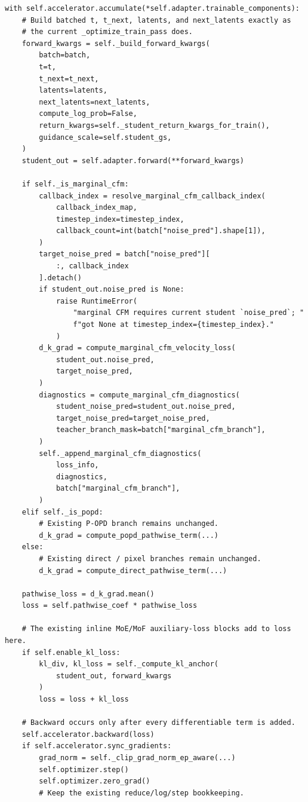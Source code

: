 \documentclass[11pt,a4paper]{article}
\theoremstyle{plain}
\theoremstyle{definition}
\begin{document}
\begin{lstlisting}[style=python,caption={Implemented A4 branch inside the existing optimizer shell, abbreviated.}]
with self.accelerator.accumulate(*self.adapter.trainable_components):
    # Build batched t, t_next, latents, and next_latents exactly as
    # the current _optimize_train_pass does.
    forward_kwargs = self._build_forward_kwargs(
        batch=batch,
        t=t,
        t_next=t_next,
        latents=latents,
        next_latents=next_latents,
        compute_log_prob=False,
        return_kwargs=self._student_return_kwargs_for_train(),
        guidance_scale=self.student_gs,
    )
    student_out = self.adapter.forward(**forward_kwargs)

    if self._is_marginal_cfm:
        callback_index = resolve_marginal_cfm_callback_index(
            callback_index_map,
            timestep_index=timestep_index,
            callback_count=int(batch["noise_pred"].shape[1]),
        )
        target_noise_pred = batch["noise_pred"][
            :, callback_index
        ].detach()
        if student_out.noise_pred is None:
            raise RuntimeError(
                "marginal CFM requires current student `noise_pred`; "
                f"got None at timestep_index={timestep_index}."
            )
        d_k_grad = compute_marginal_cfm_velocity_loss(
            student_out.noise_pred,
            target_noise_pred,
        )
        diagnostics = compute_marginal_cfm_diagnostics(
            student_noise_pred=student_out.noise_pred,
            target_noise_pred=target_noise_pred,
            teacher_branch_mask=batch["marginal_cfm_branch"],
        )
        self._append_marginal_cfm_diagnostics(
            loss_info,
            diagnostics,
            batch["marginal_cfm_branch"],
        )
    elif self._is_popd:
        # Existing P-OPD branch remains unchanged.
        d_k_grad = compute_popd_pathwise_term(...)
    else:
        # Existing direct / pixel branches remain unchanged.
        d_k_grad = compute_direct_pathwise_term(...)

    pathwise_loss = d_k_grad.mean()
    loss = self.pathwise_coef * pathwise_loss

    # The existing inline MoE/MoF auxiliary-loss blocks add to loss here.
    if self.enable_kl_loss:
        kl_div, kl_loss = self._compute_kl_anchor(
            student_out, forward_kwargs
        )
        loss = loss + kl_loss

    # Backward occurs only after every differentiable term is added.
    self.accelerator.backward(loss)
    if self.accelerator.sync_gradients:
        grad_norm = self._clip_grad_norm_ep_aware(...)
        self.optimizer.step()
        self.optimizer.zero_grad()
        # Keep the existing reduce/log/step bookkeeping.
\end{lstlisting}
\end{document}
